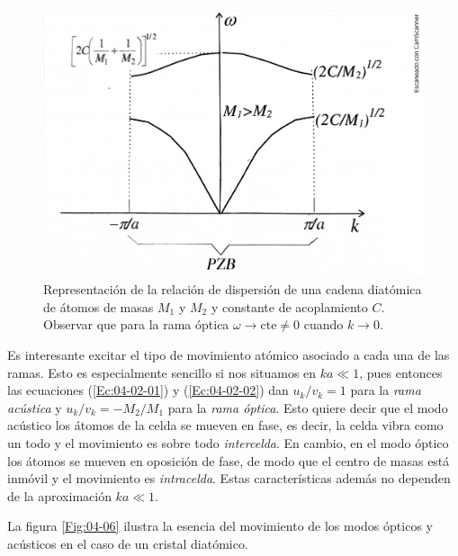 \begin{figure}[h!] \centering
    \includegraphics[scale=0.43]{Cuerpo/Ch_04/Fotos libro 5.pdf}
    \caption{Representación de la relación de dispersión de una cadena diatómica de átomos de masas $M_1$ y $M_2$ y constante de acoplamiento $C$. Observar que para la rama óptica $\omega \rightarrow \text{cte} \neq 0$ cuando $k\rightarrow 0$.}
    \label{Fig:04-05}
\end{figure}    

Es interesante excitar el tipo de movimiento atómico asociado a cada una de las ramas. Esto es especialmente sencillo si nos situamos en $ka\ll 1$, pues entonces las ecuaciones (\ref{Ec:04-02-01}) y (\ref{Ec:04-02-02}) dan $u_k/v_k=1$ para la \textit{rama acústica} y $u_k/v_k = -M_2/M_1$ para la \textit{rama óptica}. Esto quiere decir que el modo acústico los átomos de la celda se mueven en fase, es decir, la celda vibra como un todo y el movimiento es sobre todo \textit{intercelda}. En cambio, en el modo óptico los átomos se mueven en oposición de fase, de modo que el centro de masas está inmóvil y el movimiento es \textit{intracelda}. Estas características además no dependen de la aproximación $ka\ll 1$. 


La figura \ref{Fig:04-06} ilustra la esencia del movimiento de los modos ópticos y acústicos en el caso de un cristal diatómico. 

